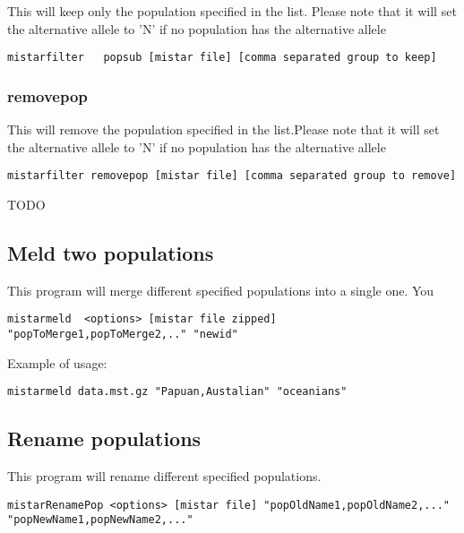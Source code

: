 \documentclass[a4paper]{article}
\begin{document}
\noindent This will keep only the population specified in the list. Please note that it will set the alternative allele to 'N' if no population has the alternative allele

\begin{lstlisting}
mistarfilter   popsub [mistar file] [comma separated group to keep]
\end{lstlisting}

\subsubsection{removepop}

\noindent This will remove the population specified in the list.Please note that it will set the alternative allele to 'N' if no population has the alternative allele

\begin{lstlisting}
mistarfilter removepop [mistar file] [comma separated group to remove]
\end{lstlisting}

TODO



\subsection{Meld two populations}

\noindent This program will merge different specified populations into a single one. You 

\small
\begin{lstlisting}
mistarmeld  <options> [mistar file zipped] "popToMerge1,popToMerge2,.." "newid"
\end{lstlisting}
\normalsize

Example of usage:
\begin{lstlisting}
mistarmeld data.mst.gz "Papuan,Austalian" "oceanians"
\end{lstlisting}


\subsection{Rename populations}

\noindent This program will rename different specified populations.

\small
\begin{lstlisting}
mistarRenamePop <options> [mistar file] "popOldName1,popOldName2,..." "popNewName1,popNewName2,..."
\end{lstlisting}
\normalsize
\end{document}
